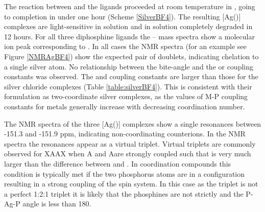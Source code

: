 The reaction between  and the \tBuxantphos{} ligands proceeded at room temperature in , going to completion in under one hour (Scheme \ref{SilverBF4}).  The resulting [Ag(\tBuxantphos)] complexes are light-sensitive in solution and in  solution completely degraded in 12 hours.  For all three diphosphine ligands the  -- mass spectra show a molecular ion peak corresponding to \ce{[Ag(diphosphine)]+}. In all cases the \phosphorus{} NMR spectra (for an example see Figure \ref{NMRAgBF4}) show the expected pair of doublets, indicating chelation to a single silver atom.  No relationship between the bite-angle and the \JAgPseven{} or \JAgPnine{} coupling constants was observed.  The \JAgPseven{} and \JAgPnine{} coupling constants are larger than those for the silver chloride complexes (Table \ref{table:silverBF4}).  This is consistent with their formulation as two-coordinate silver complexes, as the values of M-P coupling constants for  metals generally increase with decreasing coordination number.\cite{Pregosin2012}

The \fluorine{} NMR spectra of the three [Ag(\tBuxantphos)] complexes show a single resonances between -151.3 and -151.9 ppm, indicating non-coordinating  counterions.  In the \proton{} NMR spectra the \tBu{} resonances appear as a virtual triplet.  Virtual triplets are commonly observed for XAA\textprime{}X\textprime{} when A and A\textprime are strongly coupled such that  is very much larger than the difference between  and .\cite{Harris1964}  In coordination compounds this condition is typically met if the two phosphorus atoms are in a \trans{} configuration resulting in a strong coupling of the spin system.\cite{Pregosin2012}  In this case as the triplet is not a perfect 1:2:1 triplet it is likely that the phosphines are not strictly \trans{} and the P-Ag-P angle is less than 180\degrees{}.  

